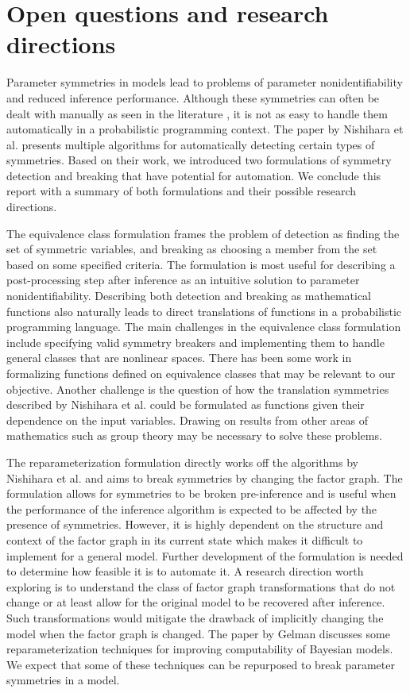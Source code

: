 

\section{Open questions and research directions}

Parameter symmetries in models lead to problems of parameter nonidentifiability and reduced inference performance. Although these symmetries can often be dealt with manually as seen in the literature \cite{Bafumi:2005,Stephens:2000}, it is not as easy to handle them automatically in a probabilistic programming context. The paper by Nishihara et al. \cite{Nishihara:2013} presents multiple algorithms for automatically detecting certain types of symmetries. Based on their work, we introduced two formulations of symmetry detection and breaking that have potential for automation. We conclude this report with a summary of both formulations and their possible research directions.

The equivalence class formulation frames the problem of detection as finding the set of symmetric variables, and breaking as choosing a member from the set based on some specified criteria. The formulation is most useful for describing a post-processing step after inference as an intuitive solution to parameter nonidentifiability. Describing both detection and breaking as mathematical functions also naturally leads to direct translations of functions in a probabilistic programming language. The main challenges in the equivalence class formulation include specifying valid symmetry breakers and implementing them to handle general classes that are nonlinear spaces. There has been some work in formalizing functions defined on equivalence classes \cite{Paulson:2006} that may be relevant to our objective. Another challenge is the question of how the translation symmetries described by Nishihara et al. could be formulated as functions given their dependence on the input variables. Drawing on results from other areas of mathematics such as group theory may be necessary to solve these problems.

The reparameterization formulation directly works off the algorithms by Nishihara et al. and aims to break symmetries by changing the factor graph. The formulation allows for symmetries to be broken pre-inference and is useful when the performance of the inference algorithm is expected to be affected by the presence of symmetries. However, it is highly dependent on the structure and context of the factor graph in its current state which makes it difficult to implement for a general model. Further development of the formulation is needed to determine how feasible it is to automate it. A research direction worth exploring is to understand the class of factor graph transformations that do not change or at least allow for the original model to be recovered after inference. Such transformations would mitigate the drawback of implicitly changing the model when the factor graph is changed. The paper by Gelman \cite{Gelman:2004} discusses some reparameterization techniques for improving computability of Bayesian models. We expect that some of these techniques can be repurposed to break parameter symmetries in a model.
